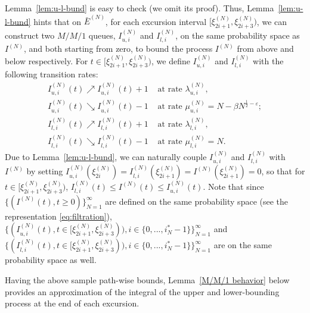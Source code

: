 \documentclass[11pt, reqno]{article}
\numberwithin{equation}{section}
\numberwithin{theorem}{section}
\begin{document}
Lemma~\ref{lem:u-l-bund} is easy to check (we omit its proof).
Thus, Lemma~\ref{lem:u-l-bund} hints that on $\bar{E}^{(N)}$, for each excursion interval $[\xi^{(N)}_{2i+1},\xi^{(N)}_{2i+3})$, we can construct two $M/M/1$ queues, $I^{(N)}_{u,i}$ and $I^{(N)}_{l,i}$, on the same probability space as $I^{(N)}$, and both starting from zero, to bound the process $I^{(N)}$ from above and below respectively. 
For $t\in [\xi^{(N)}_{2i+1},\xi^{(N)}_{2i+3})$, we define $I^{(N)}_{u,i}$ and $I^{(N)}_{l,i}$ with the following transition rates:
\begin{align*}
    I^{(N)}_{u,i}(t)\nearrow I^{(N)}_{u,i}(t)+1&\text{  at rate  }\lambda^{(N)}_{u,i},\\
    I^{(N)}_{u,i}(t)\searrow I^{(N)}_{u,i}(t)-1&\text{  at rate  }\mu^{(N)}_{u,i}=N-\beta N^{\frac{1}{2}-\varepsilon};\\
    I^{(N)}_{l,i}(t)\nearrow I^{(N)}_{l,i}(t)+1&\text{  at rate  }\lambda^{(N)}_{l,i},\\
    I^{(N)}_{l,i}(t)\searrow I^{(N)}_{l,i}(t)-1&\text{  at rate  }\mu^{(N)}_{l,i}=N.
\end{align*}
Due to Lemma~\ref{lem:u-l-bund}, we can naturally couple $I^{(N)}_{u,i}$ and $I^{(N)}_{l,i}$ with $I^{(N)}$ by setting $I^{(N)}_{u,i}(\xi^{(N)}_{2i})=I^{(N)}_{l,i}(\xi^{(N)}_{2i+1})=I^{(N)}(\xi^{(N)}_{2i+1})=0$, so that for $t\in[\xi^{(N)}_{2i+1},\xi^{(N)}_{2i+3})$, $I^{(N)}_{l,i}(t)\leq I^{(N)}(t) \leq I^{(N)}_{u,i}(t)$.
Note that since $\big\{(I^{(N)}(t),t\geq 0)\big\}_{N=1}^{\infty}$ are defined on the same probability space (see the representation \eqref{eq:filtration}), $\big\{(I_{u,i}^{(N)}(t),t\in [\xi^{(N)}_{2i+1},\xi^{(N)}_{2i+3})),i\in\{0,...,i^*_N-1\}\big\}_{N=1}^{\infty}$ and $\big\{(I_{l,i}^{(N)}(t),t\in [\xi^{(N)}_{2i+1},\xi^{(N)}_{2i+3})),i\in\{0,...,i^*_N-1\}\big\}_{N=1}^{\infty}$ are on the same probability space as well.


Having the above sample path-wise bounds, Lemma~\ref{M/M/1 behavior} below provides an approximation of the integral of the upper and lower-bounding process at the end of each excursion.
\end{document}
